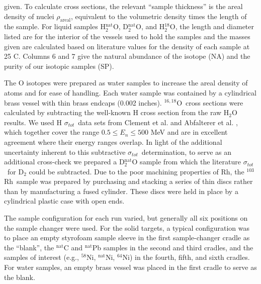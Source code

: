 \documentclass[twocolumn,secnumarabic,amssymb, nobibnotes, aps, prl,
superscriptaddress, nobalancelastpage]{revtex4}
\newcommand{\tot}{\ensuremath{\sigma_{tot}}}
\newcommand{\oSixEight}{\ensuremath{^{16,18}}O}
\newcommand{\rhThree}{\ensuremath{^{103}}R\lowercase{h}}
\begin{document}
\begin{table}[tb]
{        given. To calculate cross sections, the relevant ``sample thickness'' is the areal
        density of nuclei $\rho_{\text{areal}}$, equivalent to
        the volumetric density times the length of the sample. For liquid
        samples H$_{2}^{\text{nat}}$O, D$_{2}^{\text{nat}}$O, and H$_{2}^{18}$O,
        the length and diameter listed are for the interior of the vessels
        used to hold the samples and the masses given are calculated based on 
        literature values for the density of each sample at 25 C.
        Columns 6 and 7 give the natural abundance of the
        isotope (NA) and the purity of our isotopic samples (SP).
    }
    \label{SampleCharacteristics}
\end{table}

The O isotopes were prepared as water samples to increase the areal density
of atoms and for ease of handling. Each water sample was contained by a
cylindrical brass vessel with thin brass endcaps (0.002 inches). \oSixEight\
cross sections were calculated by
subtracting the well-known H cross section from the raw H$_{2}$O results.
We used H \tot\  data sets from Clement et al. \cite{Clement1972} and Abfalterer
et al. \cite{Abfalterer2001}, which together cover the range $0.5 \leq E_n \leq 500$ MeV
and are in excellent agreement where their energy ranges overlap. In light of
the additional uncertainty inherent to this subtractive \tot\ determination,
to serve as an additional cross-check we prepared a D$_{2}^{\text{nat}}$O sample
from which the literature \tot\ for D$_{2}$ could be subtracted. Due to
the poor machining properties of Rh, the \rhThree\ sample
was prepared by purchasing and stacking a series of thin discs rather than by
manufacturing a fused cylinder. These discs were held in place
by a cylindrical plastic case with open ends.

The sample configuration for each run varied, but generally all six positions on
the sample changer were used. For the solid targets, a typical configuration was
to place an empty styrofoam sample sleeve in the first sample-changer cradle as
the ``blank'', the $^{\text{nat}}$C and $^{\text{nat}}$Pb samples in the second and third
cradles, and the samples of interest (e.g., $^{58}$Ni, $^{\text{nat}}$Ni, $^{64}$Ni) in
the fourth, fifth, and sixth cradles. For water samples, an empty brass vessel
was placed in the first cradle to serve as the blank.
\end{document}
